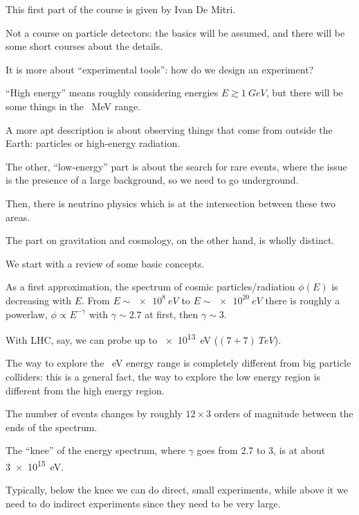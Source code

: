 \documentclass[main.tex]{subfiles}
\begin{document}

This first part of the course is given by Ivan De Mitri. 

Not a course on particle detectors: the basics will be assumed, and there will be some short courses about the details. 

It is more about ``experimental tools'': how do we design an experiment? 


``High energy'' means roughly considering energies \(E \gtrsim \SI{1}{GeV}\), but there will be some things in the \SI{}{MeV} range. 

A more apt description is about observing things that come from outside the Earth: particles or high-energy radiation. 

The other, ``low-energy'' part is about the search for rare events, where the issue is the presence of a large background, so we need to go underground. 

Then, there is neutrino physics which is at the intersection between these two areas. 

The part on gravitation and cosmology, on the other hand, is wholly distinct. 

We start with a review of some basic concepts. 

As a first approximation, the spectrum of cosmic particles/radiation \(\phi (E)\) is decreasing with \(E\). 
From \(E \sim \SI{e8}{eV}\) to \(E \sim \SI{e20}{eV}\) there is roughly a powerlaw, \(\phi \propto E^{-\gamma }\) with \(\gamma \sim 2.7\) at first, then \(\gamma \sim 3\). 


With LHC, say, we can probe up to \SI{e13}{eV} (\((7 + 7) \SI{}{TeV}\)). 

The way to explore the \SI{}{eV} energy range is completely different from big particle colliders: this is a general fact, the way to explore the low energy region is different from the high energy region. 

The number of events changes by roughly \(12 \times 3\) orders of magnitude between the ends of the spectrum. 

The ``knee'' of the energy spectrum, where \(\gamma\) goes from 2.7 to 3, is at about \SI{3e15}{eV}. 

Typically, below the knee we can do direct, small experiments, while above it we need to do indirect experiments since they need to be very large. 
\end{document}
